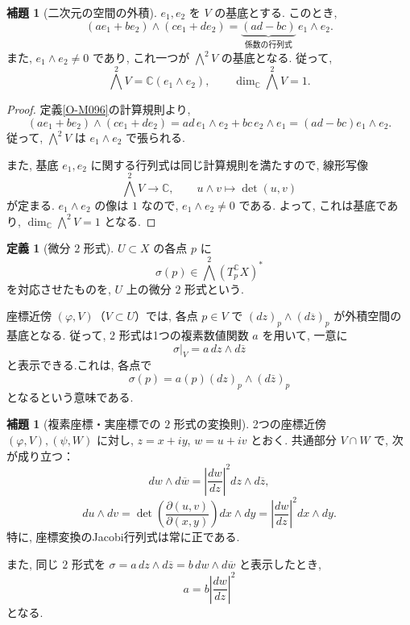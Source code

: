 \documentclass[dvipdfmx,a4paper,11pt]{article} %
\newcommand{\C}{\mathbb{C}}
\theoremstyle{definition}
\numberwithin{equation}{section}
\newtheorem{lem}[thm]{補題}
\newtheorem{dfn}[thm]{定義}
\begin{document}
\begin{lem}[二次元の空間の外積]\label{O-M097}
$e_1,e_2$ を $V$ の基底とする.
このとき,
\[
(ae_1+be_2)\wedge(ce_1+de_2)
=\underbrace{(ad-bc)}_{\text{係数の行列式}}\,e_1\wedge e_2.
\]
また, $e_1\wedge e_2\neq0$ であり,
これ一つが $\bigwedge^2V$ の基底となる.
従って,
\[
\bigwedge^2V=\C(e_1\wedge e_2),\qquad
\dim_\C\bigwedge^2V=1.
\]
\end{lem}
\begin{proof}
定義\ref{O-M096}の計算規則より,
\[
(ae_1+be_2)\wedge(ce_1+de_2)
=ad\,e_1\wedge e_2+bc\,e_2\wedge e_1
=(ad-bc)e_1\wedge e_2.
\]
従って, $\bigwedge^2V$ は $e_1\wedge e_2$ で張られる.

また, 基底 $e_1,e_2$ に関する行列式は同じ計算規則を満たすので,
線形写像
\[
\bigwedge^2V\longrightarrow\C,\qquad
u\wedge v\longmapsto\det(u,v)
\]
が定まる.
$e_1\wedge e_2$ の像は $1$ なので,
$e_1\wedge e_2\neq0$ である.
よって, これは基底であり, $\dim_\C\bigwedge^2V=1$ となる.
\end{proof}

\begin{dfn}[微分 $2$ 形式]
$U\subset X$ の各点 $p$ に
\[
\sigma(p)\in\bigwedge^2(T_{p}^{\C}X)^*
\]
を対応させたものを, $U$ 上の微分 $2$ 形式という.
\end{dfn}

座標近傍 $(\varphi,V)$（$V\subset U$）では, 各点 $p\in V$ で
$(dz)_p\wedge(d\overline z)_p$ が外積空間の基底となる.
従って, $2$ 形式は1つの複素数値関数 $a$ を用いて, 一意に
\[
\sigma|_V=a\,dz\wedge d\overline z
\]
と表示できる.これは, 各点で
\[
\sigma(p)=a(p)(dz)_p\wedge(d\overline z)_p
\]
となるという意味である.

\begin{lem}[複素座標・実座標での $2$ 形式の変換則]\label{O-M098}
2つの座標近傍 $(\varphi,V),(\psi,W)$ に対し, 
$z=x+iy$, $w=u+iv$ とおく.
共通部分 $V\cap W$ で, 次が成り立つ：
\[
dw\wedge d\overline w
=\left|\frac{dw}{dz}\right|^2 dz\wedge d\overline z,
\]
\[
du\wedge dv
=\det\left(\frac{\partial(u,v)}{\partial(x,y)}\right)dx\wedge dy
=\left|\frac{dw}{dz}\right|^2 dx\wedge dy.
\]
特に, 座標変換のJacobi行列式は常に正である.

また, 同じ $2$ 形式を
$\sigma=a\,dz\wedge d\overline z=b\,dw\wedge d\overline w$
と表示したとき, 
\[
a=b\left|\frac{dw}{dz}\right|^2
\]
となる.
\end{lem}
\end{document}
